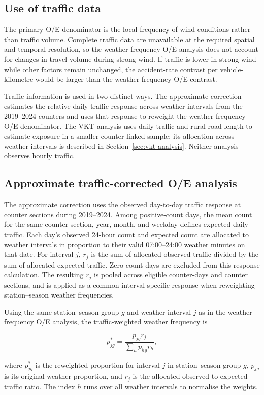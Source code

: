 \subsection{Use of traffic data}

The primary O/E denominator is the local frequency of wind conditions rather
than traffic volume. Complete traffic data are unavailable at the required
spatial and temporal resolution, so the weather-frequency O/E analysis does not account for changes in travel
volume during strong wind. If traffic is lower in strong wind while other
factors remain unchanged, the accident-rate contrast per vehicle-kilometre
would be larger than the weather-frequency O/E contrast.

Traffic information is used in two distinct ways. The approximate correction
estimates the relative daily traffic response across weather intervals from the
2019--2024 counters and uses that response to reweight the weather-frequency O/E
denominator. The VKT analysis uses daily traffic and rural road
length to estimate exposure in a smaller counter-linked sample; its allocation
across weather intervals is described in Section~\ref{sec:vkt-analysis}. Neither analysis observes hourly traffic.

\subsection{Approximate traffic-corrected O/E analysis}

The approximate correction uses the observed day-to-day traffic response at
counter sections during 2019--2024. Among positive-count days, the mean count
for the same counter section, year, month, and weekday defines expected daily
traffic. Each day's observed 24-hour count and expected count are allocated
to weather intervals in proportion to their valid 07:00--24:00 weather minutes
on that date. For interval \(j\), \(r_j\) is the sum of allocated observed
traffic divided by the sum of allocated expected traffic. Zero-count days are
excluded from this response calculation. The resulting \(r_j\) is pooled
across eligible counter-days and counter sections, and is applied as a common
interval-specific response when reweighting station--season weather frequencies.

\noindent\begin{minipage}{\linewidth}
\setlength{\parskip}{0.5\baselineskip}
Using the same station--season group \(g\) and weather interval \(j\) as in the weather-frequency O/E analysis,
the traffic-weighted weather frequency is

\begin{equation}
\label{eq:traffic-frequency}
p^{*}_{jg}=\frac{p_{jg}r_j}{\sum_h p_{hg}r_h},
\end{equation}

where \(p^{*}_{jg}\) is the reweighted proportion for interval \(j\) in
station--season group \(g\), \(p_{jg}\) is its original weather proportion,
and \(r_j\) is the allocated observed-to-expected traffic ratio. The index
\(h\) runs over all weather intervals to normalise the weights.
\end{minipage}

